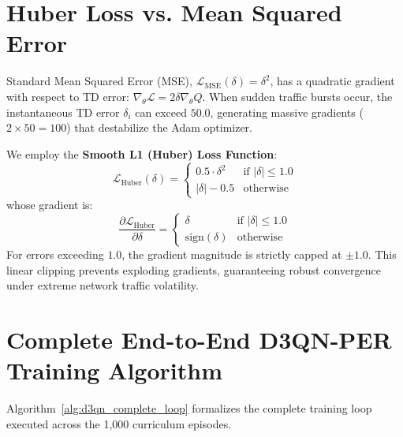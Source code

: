 \documentclass[12pt,a4paper,oneside]{report}
\begin{document}
\section{Huber Loss vs. Mean Squared Error}
Standard Mean Squared Error (MSE), $\mathcal{L}_{\text{MSE}}(\delta) = \delta^2$, has a quadratic gradient with respect to TD error: $\nabla_\theta \mathcal{L} = 2 \delta \nabla_\theta Q$. When sudden traffic bursts occur, the instantaneous TD error $\delta_i$ can exceed $50.0$, generating massive gradients ($2 \times 50 = 100$) that destabilize the Adam optimizer.

We employ the \textbf{Smooth L1 (Huber) Loss Function}:
\begin{equation}
    \mathcal{L}_{\text{Huber}}(\delta) = \begin{cases}
        0.5 \cdot \delta^2 & \text{if } |\delta| \le 1.0 \\[0.5em]
        |\delta| - 0.5 & \text{otherwise}
    \end{cases}
\end{equation}
whose gradient is:
\begin{equation}
    \frac{\partial \mathcal{L}_{\text{Huber}}}{\partial \delta} = \begin{cases}
        \delta & \text{if } |\delta| \le 1.0 \\
        \text{sign}(\delta) & \text{otherwise}
    \end{cases}
\end{equation}
For errors exceeding $1.0$, the gradient magnitude is strictly capped at $\pm 1.0$. This linear clipping prevents exploding gradients, guaranteeing robust convergence under extreme network traffic volatility.

\section{Complete End-to-End D3QN-PER Training Algorithm}
Algorithm~\ref{alg:d3qn_complete_loop} formalizes the complete training loop executed across the 1,000 curriculum episodes.
\end{document}
